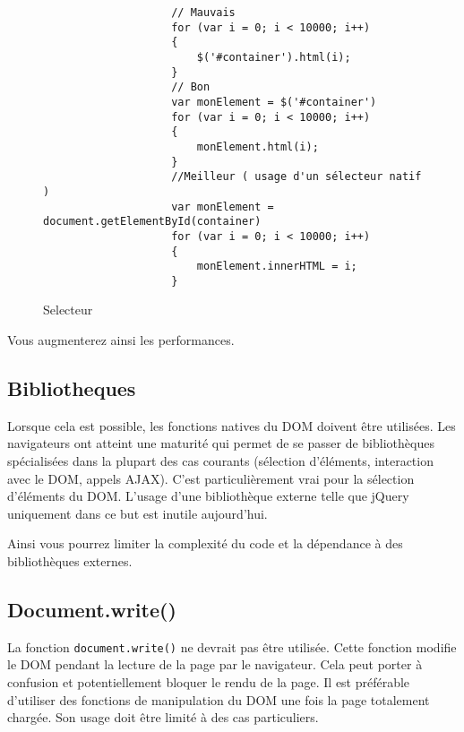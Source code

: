 			\begin{figure}[H]
				\begin{changemargin}{-2.5cm}{-2.5cm}
				\begin{tcolorbox}
				\begin{verbatim}
					// Mauvais
					for (var i = 0; i < 10000; i++)
					{
					    $('#container').html(i);
					}
					// Bon
					var monElement = $('#container')
					for (var i = 0; i < 10000; i++)
					{
					    monElement.html(i);
					}
					//Meilleur ( usage d'un sélecteur natif )
					var monElement = document.getElementById(container)
					for (var i = 0; i < 10000; i++)
					{
					    monElement.innerHTML = i;
					}
				\end{verbatim}
				\end{tcolorbox}
				\end{changemargin}
				\caption{Selecteur}
			\end{figure}

			Vous augmenterez ainsi les performances.

		\subsection{Bibliotheques}
			Lorsque cela est possible, les fonctions natives du DOM doivent être utilisées. Les navigateurs ont atteint une maturité qui permet de se passer de bibliothèques spécialisées dans la plupart des cas courants (sélection d'éléments, interaction avec le DOM, appels AJAX). C'est particulièrement vrai pour la sélection d'éléments du DOM. L'usage d'une bibliothèque externe telle que jQuery uniquement dans ce but est inutile aujourd'hui.

			Ainsi vous pourrez limiter la complexité du code et la dépendance à des bibliothèques externes.

		\subsection{Document.write()}
			La fonction \verb+document.write()+ ne devrait pas être utilisée. Cette fonction modifie le DOM pendant la lecture de la page par le navigateur. Cela peut porter à confusion et potentiellement bloquer le rendu de la page. Il est préférable d'utiliser des fonctions de manipulation du DOM une fois la page totalement chargée. Son usage doit être limité à des cas particuliers.
